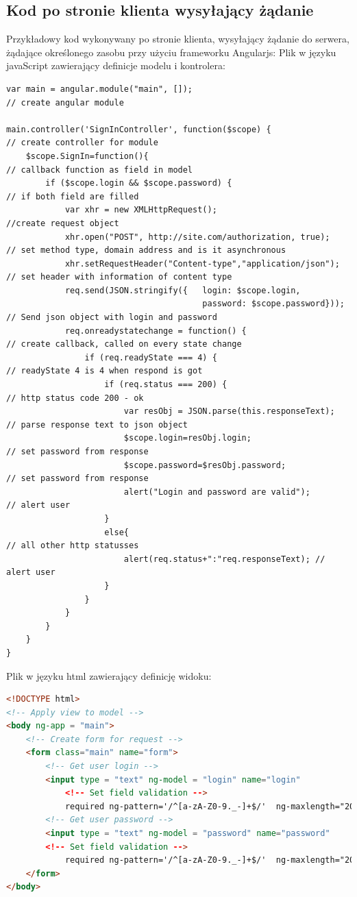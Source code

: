 \documentclass[12pt]{report}
\begin{document}
\subsection{Kod po stronie klienta wysyłający żądanie}
Przykładowy kod wykonywany po stronie klienta, wysyłający żądanie do serwera, żądające określonego zasobu przy użyciu frameworku Angularjs:
Plik w języku javaScript zawierający definicje modelu i kontrolera:
\medskip
\begin{lstlisting}
var main = angular.module("main", []); 									// create angular module

main.controller('SignInController', function($scope) { 					// create controller for module
	$scope.SignIn=function(){ 											// callback function as field in model
		if ($scope.login && $scope.password) {							// if both field are filled
			var xhr = new XMLHttpRequest();									//create request object
			xhr.open("POST", http://site.com/authorization, true);		// set method type, domain address and is it asynchronous
			xhr.setRequestHeader("Content-type","application/json");	// set header with information of content type
			req.send(JSON.stringify({	login: $scope.login,			
										password: $scope.password})); 	// Send json object with login and password
			req.onreadystatechange = function() { 						// create callback, called on every state change
				if (req.readyState === 4) { 							// readyState 4 is 4 when respond is got
					if (req.status === 200) { 							// http status code 200 - ok
						var resObj = JSON.parse(this.responseText);		// parse response text to json object
						$scope.login=resObj.login;						// set password from response
						$scope.password=$resObj.password;				// set password from response
						alert("Login and password are valid");			// alert user
					}
					else{ 												// all other http statusses
						alert(req.status+":"req.responseText); // alert user
					}
				}
			}
		}
	}
}
\end{lstlisting}
\newpage
Plik w języku html zawierający definicję widoku:
\begin{lstlisting}[language=HTML]
<!DOCTYPE html> 
<!-- Apply view to model -->
<body ng-app = "main">
	<!-- Create form for request -->
	<form class="main" name="form"> 
		<!-- Get user login -->
		<input type = "text" ng-model = "login" name="login"
			<!-- Set field validation -->
			required ng-pattern='/^[a-zA-Z0-9._-]+$/'  ng-maxlength="20" ng-minlength="3">
		<!-- Get user password -->
		<input type = "text" ng-model = "password" name="password"
		<!-- Set field validation -->
			required ng-pattern='/^[a-zA-Z0-9._-]+$/'  ng-maxlength="20" ng-minlength="3">
	</form>
</body>
\end{lstlisting}
\end{document}
